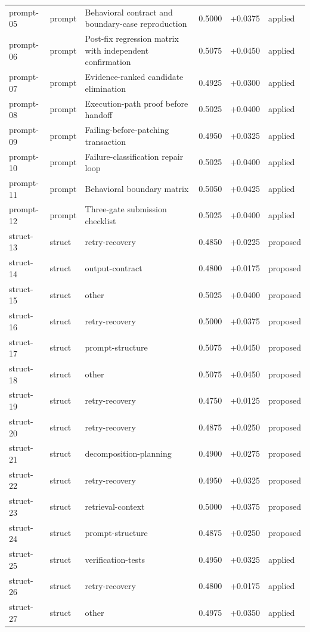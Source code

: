 \begin{center}
\begin{longtable}{llp{5.2cm}rrl}
prompt-05 & prompt & Behavioral contract and boundary-case reproduction & 0.5000 & +0.0375 & applied \\
prompt-06 & prompt & Post-fix regression matrix with independent confirmation & 0.5075 & +0.0450 & applied \\
prompt-07 & prompt & Evidence-ranked candidate elimination & 0.4925 & +0.0300 & applied \\
prompt-08 & prompt & Execution-path proof before handoff & 0.5025 & +0.0400 & applied \\
prompt-09 & prompt & Failing-before-patching transaction & 0.4950 & +0.0325 & applied \\
prompt-10 & prompt & Failure-classification repair loop & 0.5025 & +0.0400 & applied \\
prompt-11 & prompt & Behavioral boundary matrix & 0.5050 & +0.0425 & applied \\
prompt-12 & prompt & Three-gate submission checklist & 0.5025 & +0.0400 & applied \\
struct-13 & struct & retry-recovery & 0.4850 & +0.0225 & proposed \\
struct-14 & struct & output-contract & 0.4800 & +0.0175 & proposed \\
struct-15 & struct & other & 0.5025 & +0.0400 & proposed \\
struct-16 & struct & retry-recovery & 0.5000 & +0.0375 & proposed \\
struct-17 & struct & prompt-structure & 0.5075 & +0.0450 & proposed \\
struct-18 & struct & other & 0.5075 & +0.0450 & proposed \\
struct-19 & struct & retry-recovery & 0.4750 & +0.0125 & proposed \\
struct-20 & struct & retry-recovery & 0.4875 & +0.0250 & proposed \\
struct-21 & struct & decomposition-planning & 0.4900 & +0.0275 & proposed \\
struct-22 & struct & retry-recovery & 0.4950 & +0.0325 & proposed \\
struct-23 & struct & retrieval-context & 0.5000 & +0.0375 & proposed \\
struct-24 & struct & prompt-structure & 0.4875 & +0.0250 & proposed \\
struct-25 & struct & verification-tests & 0.4950 & +0.0325 & applied \\
struct-26 & struct & retry-recovery & 0.4800 & +0.0175 & applied \\
struct-27 & struct & other & 0.4975 & +0.0350 & applied \\

\end{longtable}
\end{center}
